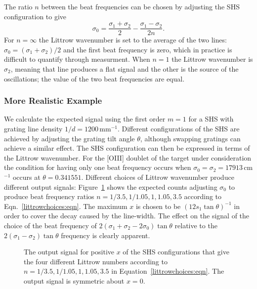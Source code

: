 \documentclass[preprint]{aastex}
\begin{document}
The ratio $n$ between the beat frequencies can be chosen by adjusting the SHS configuration to give
\begin{equation}
\sigma_0=\frac{\sigma_1+\sigma_2}{2}-\frac{\sigma_1-\sigma_2}{2n}.
\label{littrowchoices:eqn}
\end{equation}
For $n=\infty$  the Littrow wavenumber is set to the average of the two lines: $\sigma_0=(\sigma_1+\sigma_2)/2$ and the first beat frequency is zero,
which in practice is difficult to quantify through measurment.  When $n=1$ the Littrow wavenumber is $\sigma_2$, meaning that line produces a flat signal and the other is the source
of the oscillations; the value of the two beat frequencies are equal.


\subsubsection{More Realistic Example}

We calculate the expected signal using the first order $m=1$ for a SHS with grating line density $1/d=1200$\,mm$^{-1}$.
Different configurations of the SHS are achieved by adjusting the grating tilt angle $\theta$, although swapping
gratings can achieve a similar effect.
The SHS configuration can then be expressed in terms of the Littrow wavenumber.  For the [OIII] doublet of
the target under consideration
the condition for having only one beat frequency occurs when $\sigma_0=\sigma_2=17913$\,cm$^{-1}$
occurs at $\theta=0.341551$.
Different choices of Littrow wavenumber
produce different output signals:
Figure~\ref{shscounts:fig} shows the expected counts adjusting $\sigma_0$ to produce beat frequency ratios
$n=1/3.5,1/1.05,1,1.05,3.5$ according to Eqn.\ \ref{littrowchoices:eqn}.
The maximum $x$ is chosen to be $(12s_1\tan{\theta})^{-1}$ in order to cover the decay caused by the line-width.
The effect on the signal
of the choice of the beat frequency of $2(\sigma_1+\sigma_2-2\sigma_0)\tan{\theta}$ relative to the $2(\sigma_1-\sigma_2)\tan{\theta}$ frequency
is clearly apparent.

\begin{figure}[t]
   \centering
   \caption{The output signal for positive $x$ of the  SHS configurations that give the four different
   Littrow numbers according to
   $n=1/3.5,1/1.05,1,1.05,3.5$  in Equation~\ref{littrowchoices:eqn}. The output signal is symmetric about $x=0$.\label{shscounts:fig}}
\end{figure}
\end{document}
